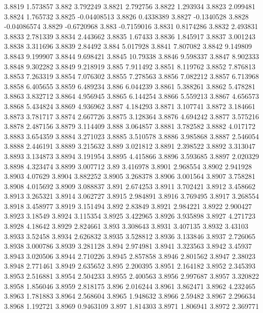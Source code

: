 3.8819  1.573857
3.882  3.792249
3.8821  2.792756
3.8822  1.293934
3.8823  2.099481
3.8824  1.765732
3.8825  -0.04408513
3.8826  0.4338389
3.8827  -0.1340528
3.8828  -0.04086574
3.8829  -0.6720968
3.883  -0.7159016
3.8831  0.8174286
3.8832  2.493831
3.8833  2.781339
3.8834  2.443662
3.8835  1.67433
3.8836  1.845917
3.8837  3.001243
3.8838  3.311696
3.8839  2.84492
3.884  5.017928
3.8841  7.807082
3.8842  9.149809
3.8843  9.199907
3.8844  9.698421
3.8845  10.79338
3.8846  9.598337
3.8847  8.902333
3.8848  9.302282
3.8849  9.218919
3.885  7.911492
3.8851  8.119762
3.8852  7.876813
3.8853  7.263319
3.8854  7.076302
3.8855  7.278563
3.8856  7.082212
3.8857  6.713968
3.8858  6.405655
3.8859  6.489234
3.886  6.044239
3.8861  5.388261
3.8862  5.478281
3.8863  3.832712
3.8864  4.956945
3.8865  6.144254
3.8866  5.559213
3.8867  4.656573
3.8868  5.434824
3.8869  4.936962
3.887  4.184293
3.8871  3.107741
3.8872  3.184661
3.8873  3.781717
3.8874  2.667726
3.8875  3.128364
3.8876  4.694242
3.8877  3.575216
3.8878  2.487156
3.8879  3.114409
3.888  3.064857
3.8881  3.782582
3.8882  4.017172
3.8883  3.654359
3.8884  3.271023
3.8885  3.510578
3.8886  3.985868
3.8887  2.546054
3.8888  2.446191
3.8889  3.215632
3.889  3.021812
3.8891  2.398522
3.8892  3.313047
3.8893  3.134873
3.8894  3.191954
3.8895  4.415866
3.8896  3.593685
3.8897  2.020329
3.8898  4.323474
3.8899  3.007712
3.89  3.416978
3.8901  2.968554
3.8902  2.941928
3.8903  4.07629
3.8904  3.882252
3.8905  3.268378
3.8906  3.001564
3.8907  3.758281
3.8908  4.015692
3.8909  3.088837
3.891  2.674253
3.8911  3.702421
3.8912  3.458662
3.8913  3.265321
3.8914  3.062727
3.8915  2.984891
3.8916  3.769495
3.8917  3.268554
3.8918  3.458977
3.8919  3.151494
3.892  2.83849
3.8921  2.984221
3.8922  2.900427
3.8923  3.18549
3.8924  3.115354
3.8925  3.422965
3.8926  3.935898
3.8927  4.271723
3.8928  4.18642
3.8929  2.824661
3.893  3.308643
3.8931  3.407135
3.8932  3.43103
3.8933  3.52458
3.8934  2.626832
3.8935  3.528812
3.8936  3.133846
3.8937  2.726065
3.8938  3.000786
3.8939  3.281128
3.894  2.974981
3.8941  3.323563
3.8942  3.45937
3.8943  3.020506
3.8944  2.710226
3.8945  2.857858
3.8946  2.801562
3.8947  2.38023
3.8948  2.771461
3.8949  2.635652
3.895  2.200395
3.8951  2.164182
3.8952  2.345393
3.8953  2.516881
3.8954  2.504233
3.8955  2.400563
3.8956  2.997687
3.8957  3.320822
3.8958  1.856046
3.8959  2.818175
3.896  2.016244
3.8961  3.862471
3.8962  4.232465
3.8963  1.781883
3.8964  2.568604
3.8965  1.948632
3.8966  2.59482
3.8967  2.296634
3.8968  1.192721
3.8969  0.9463109
3.897  1.814303
3.8971  1.806941
3.8972  2.369771
